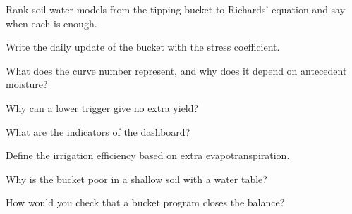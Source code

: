 \begin{exlist}
\item Rank soil-water models from the tipping bucket to Richards' equation and say when each is enough.
\item Write the daily update of the bucket with the stress coefficient.
\item What does the curve number represent, and why does it depend on antecedent moisture?
\item Why can a lower trigger give no extra yield?
\item What are the indicators of the dashboard?
\item Define the irrigation efficiency based on extra evapotranspiration.
\item Why is the bucket poor in a shallow soil with a water table?
\item How would you check that a bucket program closes the balance?
\end{exlist}
